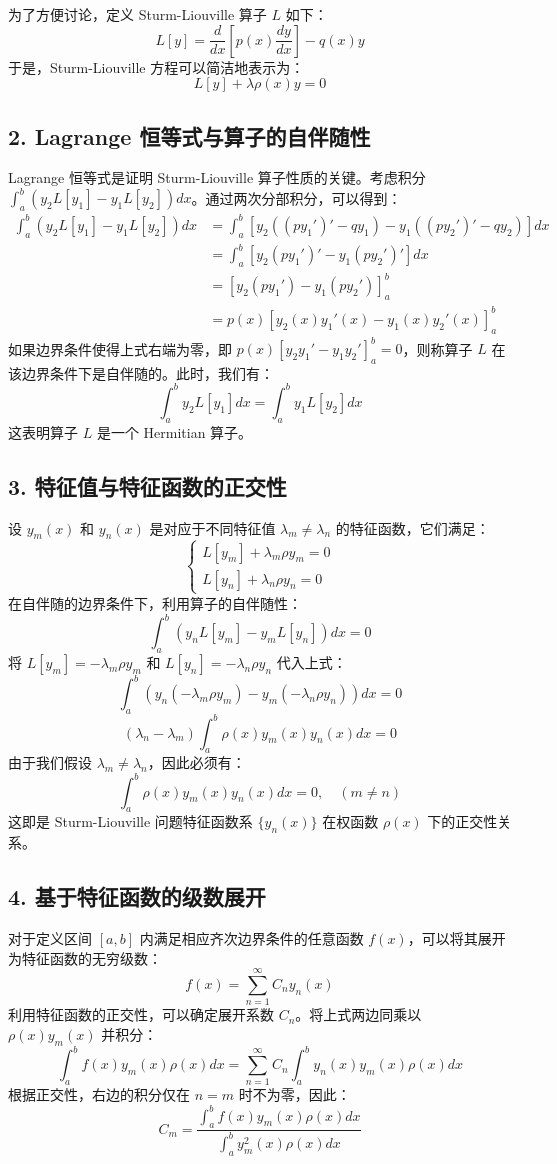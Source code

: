 \documentclass{article}
\begin{document}
	为了方便讨论，定义 Sturm-Liouville 算子 $L$ 如下：
	\[
	L[y] = \frac{d}{dx} \left[ p(x) \frac{dy}{dx} \right] - q(x)y
	\]
	于是，Sturm-Liouville 方程可以简洁地表示为：
	\[
	L[y] + \lambda \rho(x)y = 0
	\]
	
	\subsection*{2. Lagrange 恒等式与算子的自伴随性}
	Lagrange 恒等式是证明 Sturm-Liouville 算子性质的关键。考虑积分 $\int_a^b (y_2 L[y_1] - y_1 L[y_2]) dx$。通过两次分部积分，可以得到：
	\begin{align*}
		\int_a^b (y_2 L[y_1] - y_1 L[y_2]) dx &= \int_a^b \left[ y_2 \left( (py_1')' - qy_1 \right) - y_1 \left( (py_2')' - qy_2 \right) \right] dx \\
		&= \int_a^b \left[ y_2 (py_1')' - y_1 (py_2')' \right] dx \\
		&= \left[ y_2 (py_1') - y_1 (py_2') \right]_a^b \\
		&= p(x) \left[ y_2(x)y_1'(x) - y_1(x)y_2'(x) \right]_a^b
	\end{align*}
	如果边界条件使得上式右端为零，即 $p(x) [ y_2y_1' - y_1y_2' ]_a^b = 0$，则称算子 $L$ 在该边界条件下是自伴随的。此时，我们有：
	\[
	\int_a^b y_2 L[y_1] dx = \int_a^b y_1 L[y_2] dx
	\]
	这表明算子 $L$ 是一个 Hermitian 算子。
	
	\subsection*{3. 特征值与特征函数的正交性}
	设 $y_m(x)$ 和 $y_n(x)$ 是对应于不同特征值 $\lambda_m \neq \lambda_n$ 的特征函数，它们满足：
	\[
	\begin{cases}
		L[y_m] + \lambda_m \rho y_m = 0 \\
		L[y_n] + \lambda_n \rho y_n = 0
	\end{cases}
	\]
	在自伴随的边界条件下，利用算子的自伴随性：
	\[
	\int_a^b (y_n L[y_m] - y_m L[y_n]) dx = 0
	\]
	将 $L[y_m] = -\lambda_m \rho y_m$ 和 $L[y_n] = -\lambda_n \rho y_n$ 代入上式：
	\[
	\int_a^b (y_n (-\lambda_m \rho y_m) - y_m (-\lambda_n \rho y_n)) dx = 0
	\]
	\[
	(\lambda_n - \lambda_m) \int_a^b \rho(x) y_m(x) y_n(x) dx = 0
	\]
	由于我们假设 $\lambda_m \neq \lambda_n$，因此必须有：
	\[
	\int_a^b \rho(x) y_m(x) y_n(x) dx = 0, \quad (m \neq n)
	\]
	这即是 Sturm-Liouville 问题特征函数系 $\{y_n(x)\}$ 在权函数 $\rho(x)$ 下的正交性关系。
	
	\subsection*{4. 基于特征函数的级数展开}
	对于定义区间 $[a,b]$ 内满足相应齐次边界条件的任意函数 $f(x)$，可以将其展开为特征函数的无穷级数：
	\[
	f(x) = \sum_{n=1}^{\infty} C_n y_n(x)
	\]
	利用特征函数的正交性，可以确定展开系数 $C_n$。将上式两边同乘以 $\rho(x)y_m(x)$ 并积分：
	\[
	\int_a^b f(x) y_m(x) \rho(x) dx = \sum_{n=1}^{\infty} C_n \int_a^b y_n(x) y_m(x) \rho(x) dx
	\]
	根据正交性，右边的积分仅在 $n=m$ 时不为零，因此：
	\[
	C_m = \frac{\int_a^b f(x) y_m(x) \rho(x) dx}{\int_a^b y_m^2(x) \rho(x) dx}
	\]
	
\end{document}
